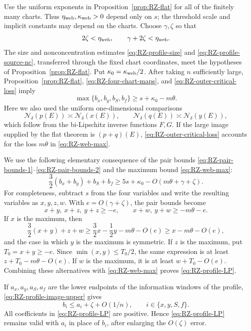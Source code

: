 \documentclass[11pt]{article}
\begin{document}
Use the uniform exponents in Proposition~\ref{prop:RZ-flat} for all
of the finitely many charts.  Thus
\(\eta_{\rm web},\kappa_{\rm web}>0\) depend only on \(s\); the
threshold scale and implicit constants may depend on the charts.
Choose \(\gamma,\zeta\) so that
\begin{equation}
 2\zeta<\eta_{\rm web},\qquad
 \gamma+2\zeta<\eta_{\rm web}.
 \label{eq:RZ-web-parameters}
\end{equation}
The size and nonconcentration estimates
\eqref{eq:RZ-profile-size} and
\eqref{eq:RZ-profile-source-nc}, transferred through the fixed chart
coordinates, meet the hypotheses of
Proposition~\ref{prop:RZ-flat}.  Put
\(\kappa_0=\kappa_{\rm web}/2\).  After taking \(n\)
sufficiently large, Proposition~\ref{prop:RZ-flat},
\eqref{eq:RZ-four-chart-maps}, and
\eqref{eq:RZ-outer-critical-loss} imply
\begin{equation}
 \max\{b_x,b_y,b_S,b_f\}
 \ge s+\kappa_0-m\theta.
 \label{eq:RZ-web-max}
\end{equation}
Here we also used the uniform one-dimensional comparisons
\[
 \mathcal N_\delta(p(E))\asymp\mathcal N_\delta(x(E)),
 \qquad
 \mathcal N_\delta(q(E))\asymp\mathcal N_\delta(y(E)),
\]
which follow from the bi-Lipschitz inverse functions \(F,G\).  If the
large image supplied by the flat theorem is \((p+q)(E)\),
\eqref{eq:RZ-outer-critical-loss} accounts for the loss
\(m\theta\) in \eqref{eq:RZ-web-max}.

We use the following elementary consequence of the pair bounds
\eqref{eq:RZ-pair-bounds-1}--\eqref{eq:RZ-pair-bounds-2} and the
maximum bound \eqref{eq:RZ-web-max}:
\begin{equation}
 \frac{3}{2}(b_x+b_y)+b_S+b_f
 \ge5s+\kappa_0
      -O(m\theta+\gamma+\zeta).
 \label{eq:RZ-profile-LP}
\end{equation}
For completeness, subtract \(s\) from the four variables and write
the resulting variables as \(x,y,z,w\).  With
\(e=O(\gamma+\zeta)\), the pair bounds become
\[
 x+y,\ x+z,\ y+z\ge-e,
 \qquad x+w,\ y+w\ge-m\theta-e.
\]
If \(x\) is the maximum, then
\[
 \frac{3}{2}(x+y)+z+w
 \ge\frac{3}{2}x-\frac{1}{2}y-m\theta-O(e)
 \ge x-m\theta-O(e),
\]
and the case in which \(y\) is the maximum is symmetric.  If \(z\)
is the maximum, put \(T_0=x+y\ge-e\).  Since
\(\min(x,y)\le T_0/2\), the same expression is at least
\(z+T_0-m\theta-O(e)\).  If \(w\) is the maximum, it is at least
\(w+T_0-O(e)\).  Combining these alternatives with
\eqref{eq:RZ-web-max} proves \eqref{eq:RZ-profile-LP}.

If \(a_x,a_y,a_S,a_f\) are the lower endpoints of the information
windows of the profile, \eqref{eq:RZ-profile-image-upper} gives
\begin{equation}
 b_i\le a_i+\zeta+O(1/n),
 \qquad i\in\{x,y,S,f\}.
 \label{eq:RZ-cover-information-bridge}
\end{equation}
All coefficients in \eqref{eq:RZ-profile-LP} are positive.  Hence
\eqref{eq:RZ-profile-LP} remains valid with \(a_i\) in place of
\(b_i\), after enlarging the \(O(\zeta)\) error.
\end{document}
